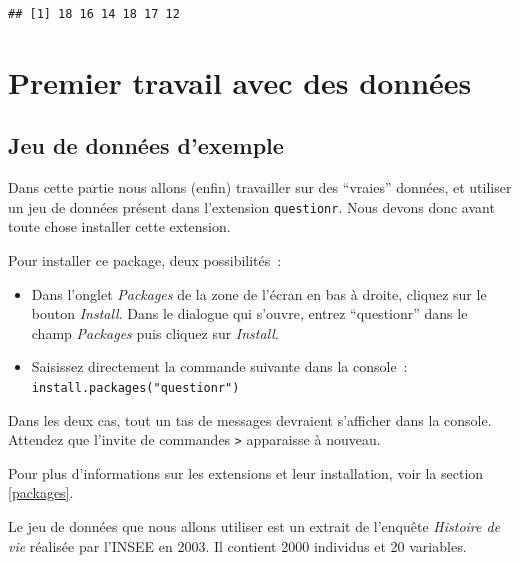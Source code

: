 \documentclass[12pt,]{book}
\providecommand{\tightlist}{%
  \setlength{\itemsep}{0pt}\setlength{\parskip}{0pt}}
\begin{document}
\begin{verbatim}
## [1] 18 16 14 18 17 12
\end{verbatim}

\hypertarget{premier-travail-avec-des-donnuxe9es}{%
\section{Premier travail avec des données}\label{premier-travail-avec-des-donnuxe9es}}

\hypertarget{jeu-de-donnuxe9es-dexemple}{%
\subsection{Jeu de données d'exemple}\label{jeu-de-donnuxe9es-dexemple}}

Dans cette partie nous allons (enfin) travailler sur des ``vraies'' données, et utiliser un jeu de données présent dans l'extension \texttt{questionr}. Nous devons donc avant toute chose installer cette extension.

Pour installer ce package, deux possibilités~:

\begin{itemize}
\tightlist
\item
  Dans l'onglet \emph{Packages} de la zone de l'écran en bas à droite, cliquez sur le bouton \emph{Install}. Dans le dialogue qui s'ouvre, entrez ``questionr'' dans le champ \emph{Packages} puis cliquez sur \emph{Install}.
\item
  Saisissez directement la commande suivante dans la console~: \texttt{install.packages("questionr")}
\end{itemize}

Dans les deux cas, tout un tas de messages devraient s'afficher dans la console. Attendez que l'invite de commandes \texttt{\textgreater{}} apparaisse à nouveau.

Pour plus d'informations sur les extensions et leur installation, voir la section \ref{packages}.

Le jeu de données que nous allons utiliser est un extrait de l'enquête \emph{Histoire de vie} réalisée par l'INSEE en 2003. Il contient 2000 individus et 20 variables.
\end{document}
